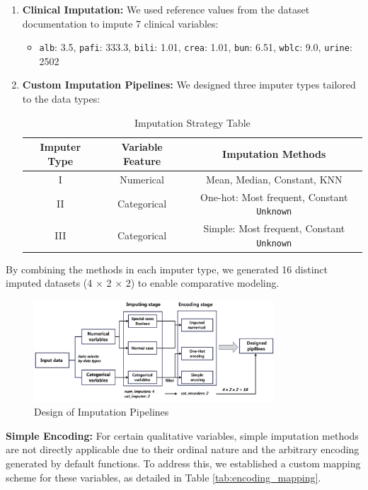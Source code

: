 \begin{enumerate}
    \item \textbf{Clinical Imputation:} We used reference values from the dataset documentation to impute 7 clinical variables:
    \begin{itemize}
        \item \texttt{alb}: 3.5, \texttt{pafi}: 333.3, \texttt{bili}: 1.01, \texttt{crea}: 1.01, \texttt{bun}: 6.51, \texttt{wblc}: 9.0, \texttt{urine}: 2502
    \end{itemize}
    
    \item \textbf{Custom Imputation Pipelines:} We designed three imputer types tailored to the data types:
    \begin{table}[H]
    \centering
    \caption{Imputation Strategy Table}
    \begin{tabular}{|c|c|c|}
    \hline
    \textbf{Imputer Type} & \textbf{Variable Feature} & \textbf{Imputation Methods} \\
    \hline
    I   & Numerical        & Mean, Median, Constant, KNN \\
    II  & Categorical      & One-hot: Most frequent, Constant \texttt{Unknown} \\
    III & Categorical      & Simple: Most frequent, Constant \texttt{Unknown} \\
    \hline
    \end{tabular}
    \end{table}
\end{enumerate}

By combining the methods in each imputer type, we generated 16 distinct
imputed datasets (4 $\times$ 2 $\times$ 2) to enable comparative modeling.


\begin{figure}[!h]
\centering
\includegraphics[width=0.8\textwidth]{../results/pipeline_imputing.png}
\caption{Design of Imputation Pipelines}
\label{fig:imputation_pipeline}
\end{figure}

\textbf{Simple Encoding:} For certain qualitative variables, 
simple imputation methods are not directly applicable due to their ordinal nature and
the arbitrary encoding generated by default functions. 
To address this, we established a custom mapping scheme for these variables,
as detailed in Table \ref{tab:encoding_mapping}.


